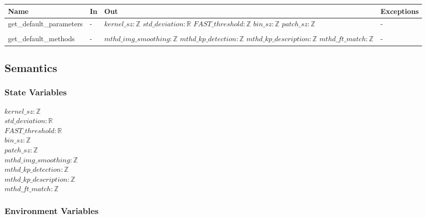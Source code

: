 \documentclass[12pt, titlepage]{article}
\begin{document}
\begin{center}
\begin{tabular}{p{4cm} p{3.5cm} p{4cm} p{3.5cm}}
\hline
\textbf{Name} & \textbf{In} & \textbf{Out} & \textbf{Exceptions} \\
\hline
get\_default\_parameters & - & 
$kernel\_sz: \mathbb{Z}$ \newline 
$std\_deviation: \mathbb{R}$ \newline 
$FAST\_threshold: \mathbb{Z}$ \newline 
$bin\_sz: \mathbb{Z}$ \newline 
$patch\_sz: \mathbb{Z}$ 
& - \\ \\
get\_default\_methods & - & 
$mthd\_img\_smoothing:\mathbb{Z}$ \newline 
$mthd\_kp\_detection:\mathbb{Z}$ \newline 
$mthd\_kp\_description:\mathbb{Z}$ \newline 
$mthd\_ft\_match:\mathbb{Z}$ \newline 
& - \\
\hline
\end{tabular}
\end{center}

\subsection{Semantics}

\subsubsection{State Variables}

$kernel\_sz: \mathbb{Z}$ \\
$std\_deviation: \mathbb{R}$ \\
$FAST\_threshold: \mathbb{R}$ \\
$bin\_sz: \mathbb{Z}$ \\
$patch\_sz: \mathbb{Z}$ \\
$mthd\_img\_smoothing: \mathbb{Z}$ \\
$mthd\_kp\_detection: \mathbb{Z}$ \\
$mthd\_kp\_description: \mathbb{Z}$ \\
$mthd\_ft\_match: \mathbb{Z}$ \\

\subsubsection{Environment Variables}
\end{document}
